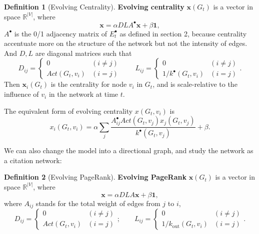 \documentclass[12pt,abstract=true]{scrartcl}
\numberwithin{equation}{section}
\theoremstyle{definition}   \newtheorem{definition}{Definition}[section]
\theoremstyle{plain}        \newtheorem{theorem}{Theorem}[section]
\theoremstyle{plain}        \newtheorem{observation}{Observation}[section]
\theoremstyle{plain}        \newtheorem{fact}{Fact}[section]
\theoremstyle{plain}        \newtheorem{claim}{Claim}[section]
\theoremstyle{plain}        \newtheorem{lemma}[theorem]{Lemma}
\theoremstyle{plain}        \newtheorem{corollary}[theorem]{Corollary}
\theoremstyle{remark}       \newtheorem{example}{Example}[section]
\theoremstyle{remark}       \newtheorem{remark}{Remark}[section]
\begin{document}
\begin{definition}[Evolving Centrality]
\textbf{Evolving centrality} $\textbf{x}(G_t)$ is a vector in space
$\mathbb{R}^{|V|}$, where
\begin{equation}
\mathbf{x}=\alpha DLA^\bullet \mathbf{x} + \beta\mathbf{1},
\end{equation}
$A^\bullet$ is the 0/1 adjacency matrix of $E^\bullet_t$ as defined in section 2,
because centrality accentuate more on the structure of the network but not the
intensity of edges. And
$D,L$ are diagonal matrices such that
\begin{equation}
D_{ij}=\begin{cases}
0&(i\neq j)\\
\mathit{Act}(G_t,v_i)&(i=j)
\end{cases}\qquad
L_{ij}=\begin{cases}
0&(i\neq j)\\
1/k^\bullet(G_t,v_i)&(i=j)
\end{cases}.
\end{equation}
Then $\textbf{x}_i(G_t)$ is the centrality for node $v_i$ in $G_t$, and is
scale-relative to the influence of $v_i$ in the network at time $t$.
\end{definition}

The equivalent form of evolving centrality $x(G_t,v_i)$ is 
\begin{equation}
x_i(G_t,v_i)=\alpha\sum_j\frac{A^\bullet_{ij}
\mathit{Act}(G_t,v_j)x_j(G_t,v_j)}{k^\bullet(G_t,v_j)}+\beta.
\end{equation}

We can also change the model into a directional graph, and study the network as
a citation network:

\begin{definition}[Evolving PageRank]
\textbf{Evolving PageRank} $\textbf{x}(G_t)$ is a vector in space
$\mathbb{R}^{|V|}$, where
\begin{equation}
\mathbf{x}=\alpha DLA \mathbf{x} + \beta\mathbf{1},
\end{equation}
where $A_{ij}$ stands for the total weight of edges from $j$ to $i$,
\begin{equation}
D_{ij}=\begin{cases}
0&(i\neq j)\\
\mathit{Act}(G_t,v_i)&(i=j)
\end{cases};\qquad
L_{ij}=\begin{cases}
0&(i\neq j)\\
1/k_{\mathrm{out}}(G_t,v_i)&(i=j)
\end{cases}.
\end{equation}
\end{definition}
\end{document}
